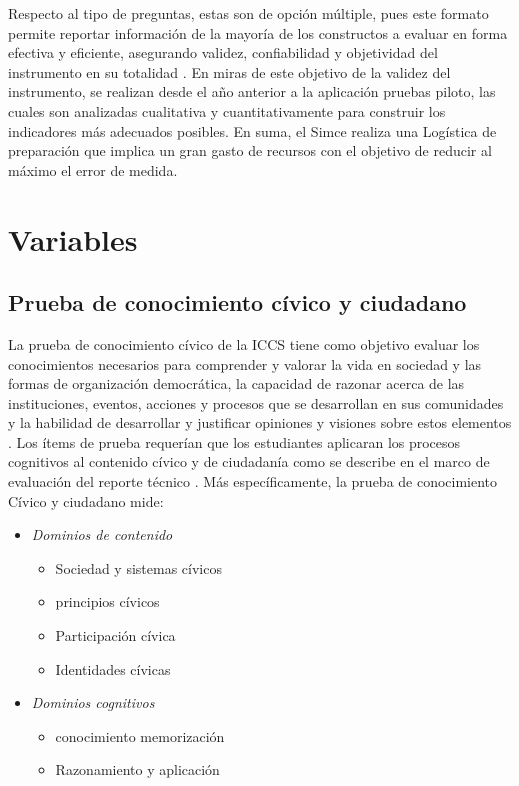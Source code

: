 \documentclass[12pt,twoside]{templates/facsothesis}
\providecommand{\tightlist}{%
  \setlength{\itemsep}{0pt}\setlength{\parskip}{0pt}}
\begin{document}
Respecto al tipo de preguntas, estas son de opción múltiple, pues este formato permite reportar información de la mayoría de los constructos a evaluar en forma efectiva y eficiente, asegurando validez, confiabilidad y objetividad del instrumento en su totalidad \citep{rupp_Handbook_2008}. En miras de este objetivo de la validez del instrumento, se realizan desde el año anterior a la aplicación pruebas piloto, las cuales son analizadas cualitativa y cuantitativamente para construir los indicadores más adecuados posibles. En suma, el Simce realiza una Logística de preparación que implica un gran gasto de recursos con el objetivo de reducir al máximo el error de medida.

\hypertarget{variables}{%
\section{Variables}\label{variables}}

\hypertarget{prueba-de-conocimiento-cuxedvico-y-ciudadano}{%
\subsection{Prueba de conocimiento cívico y ciudadano}\label{prueba-de-conocimiento-cuxedvico-y-ciudadano}}

La prueba de conocimiento cívico de la ICCS tiene como objetivo evaluar los conocimientos necesarios para comprender y valorar la vida en sociedad y las formas de organización democrática, la capacidad de razonar acerca de las instituciones, eventos, acciones y procesos que se desarrollan en sus comunidades y la habilidad de desarrollar y justificar opiniones y visiones sobre estos elementos \citep{schulz_Initial_2010}. Los ítems de prueba requerían que los estudiantes aplicaran los procesos cognitivos al contenido cívico y de ciudadanía como se describe en el marco de evaluación del reporte técnico \citep{schulz_ICCS_2016}. Más específicamente, la prueba de conocimiento Cívico y ciudadano mide:

\begin{itemize}
\tightlist
\item
  \emph{Dominios de contenido}

  \begin{itemize}
  \tightlist
  \item
    Sociedad y sistemas cívicos
  \item
    principios cívicos
  \item
    Participación cívica
  \item
    Identidades cívicas
  \end{itemize}
\item
  \emph{Dominios cognitivos}

  \begin{itemize}
  \tightlist
  \item
    conocimiento memorización
  \item
    Razonamiento y aplicación
  \end{itemize}
\end{itemize}
\end{document}
